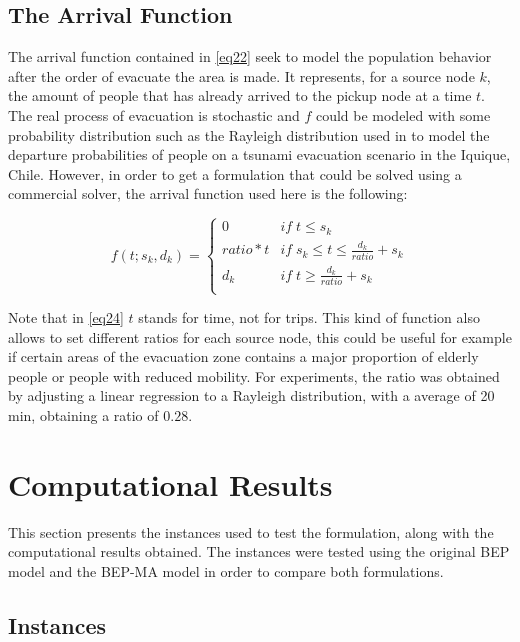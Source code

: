 \documentclass[conference]{IEEEtran}
\begin{document}
\subsection{The Arrival Function}

The arrival function contained in \eqref{eq22} seek to model the population behavior after the order of evacuate the area is made. It represents, for a source node $k$, the amount of people that has already arrived to the pickup node at a time $t$. The real process of evacuation is stochastic and $f$ could be modeled with some probability distribution such as the Rayleigh distribution used in \cite{b4} to model the departure probabilities of people on a tsunami evacuation scenario in the Iquique, Chile. However, in order to get a formulation that could be solved using a commercial solver, the arrival function used here is the following:

\begin{equation}
    f(t; s_{k}, d_{k}) = 
    \begin{cases} 
      0 & if \; t\leq s_{k} \\
      ratio * t & if \; s_{k} \leq t \leq \frac{d_{k}}{ratio} + s_{k}\\
      d_{k} & if \; t \geq \frac{d_{k}}{ratio} + s_{k}\\\label{eq24}
   \end{cases}
\end{equation} 

Note that in \eqref{eq24} $t$ stands for time, not for trips. This kind of function also allows to set different ratios for each source node, this could be useful for example if certain areas of the evacuation zone contains a major proportion of elderly people or people with reduced mobility. For experiments, the ratio was obtained by adjusting a linear regression to a Rayleigh distribution, with a average of 20 min, obtaining a ratio of $0.28$.

\section{Computational Results}

This section presents the instances used to test the formulation, along with the computational results obtained. The instances were tested using the original BEP model and the BEP-MA model in order to compare both formulations.

\subsection{Instances}
\end{document}
